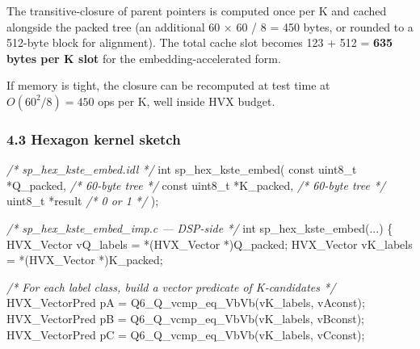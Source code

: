 \documentclass[
  11pt,
]{article}
\newenvironment{Shaded}{}{}
\newcommand{\CommentTok}[1]{\textcolor[rgb]{0.38,0.63,0.69}{\textit{#1}}}
\newcommand{\DataTypeTok}[1]{\textcolor[rgb]{0.56,0.13,0.00}{#1}}
\newcommand{\NormalTok}[1]{#1}
\begin{document}
The transitive-closure of parent pointers is computed once per K and
cached alongside the packed tree (an additional 60 × 60 / 8 = 450 bytes,
or rounded to a 512-byte block for alignment). The total cache slot
becomes 123 + 512 = \textbf{635 bytes per K slot} for the
embedding-accelerated form.

If memory is tight, the closure can be recomputed at test time at
\(O(60^2 / 8) = 450\) ops per K, well inside HVX budget.

\hypertarget{hexagon-kernel-sketch}{%
\subsubsection{4.3 Hexagon kernel sketch}\label{hexagon-kernel-sketch}}

\begin{Shaded}
\begin{Highlighting}[]
\CommentTok{/* sp\_hex\_kste\_embed.idl */}
\DataTypeTok{int}\NormalTok{ sp\_hex\_kste\_embed(}
    \DataTypeTok{const} \DataTypeTok{uint8\_t}\NormalTok{ *Q\_packed,   }\CommentTok{/* 60{-}byte tree */}
    \DataTypeTok{const} \DataTypeTok{uint8\_t}\NormalTok{ *K\_packed,   }\CommentTok{/* 60{-}byte tree */}
    \DataTypeTok{uint8\_t}\NormalTok{ *result            }\CommentTok{/* 0 or 1 */}
\NormalTok{);}

\CommentTok{/* sp\_hex\_kste\_embed\_imp.c — DSP{-}side */}
\DataTypeTok{int}\NormalTok{ sp\_hex\_kste\_embed(...) \{}
\NormalTok{    HVX\_Vector vQ\_labels   = *(HVX\_Vector *)Q\_packed;}
\NormalTok{    HVX\_Vector vK\_labels   = *(HVX\_Vector *)K\_packed;}

    \CommentTok{/* For each label class, build a vector predicate of K{-}candidates */}
\NormalTok{    HVX\_VectorPred pA = Q6\_Q\_vcmp\_eq\_VbVb(vK\_labels, vAconst);}
\NormalTok{    HVX\_VectorPred pB = Q6\_Q\_vcmp\_eq\_VbVb(vK\_labels, vBconst);}
\NormalTok{    HVX\_VectorPred pC = Q6\_Q\_vcmp\_eq\_VbVb(vK\_labels, vCconst);}


\end{Highlighting}
\end{Shaded}
\end{document}
